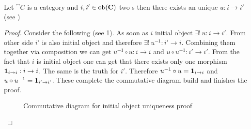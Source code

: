 \begin{theorem}
\label{thm:initial_object_unique}
Let $\cat{C}$ is a category and $i, i' \in \mathrm{ob}(\mathbf{C})$ two
s then there exists an unique
 $u: i \to i'$ (see
) 
\begin{proof}
Consider the following  (see
\cref{fig:initial_object_unique}). As soon as $i$ initial object
$\exists! \, u: i \to i'$. From other side $i'$ is also initial object
and therefore $\exists! \, u^{-1}: i' \to i$. Combining them together
via composition we can get $u^{-1} \circ u: i \to i$ and $u \circ
u^{-1}: i' \to i'$. From the fact that $i$ is initial object one can
get that there exists
only one morphism $\mathbf{1}_{ i \to i }: i \to i$. The same is the truth for $i'$.
Therefore $u^{-1} \circ u = \mathbf{1}_{ i \to i }$ and $u \circ u^{-1} = \mathbf{1}_{ i' \to i' }$.
These complete the commutative diagram build and finishes the proof. 
\begin{figure}
  \centering
  \caption{Commutative diagram for initial object uniqueness  proof}
  \label{fig:initial_object_unique}
\end{figure}
\end{proof}
\end{theorem}

